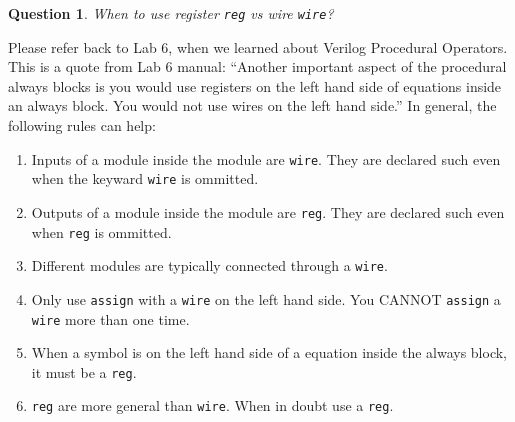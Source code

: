 \documentclass{article}
\newtheorem{question}{Question}
\begin{document}
\begin{question}
  When to use register \lstinline[style=verilog-style]{reg} vs wire \lstinline[style=verilog-style]{wire}?
\end{question}
Please refer back to Lab 6, when we learned about Verilog Procedural Operators.
This is a quote from Lab 6 manual: ``Another important aspect of the procedural
always blocks is you would use registers on the left hand side of equations
inside an always block. You would not use wires on the left hand side.'' In
general, the following rules can help:
\begin{enumerate}
  \item Inputs of a module inside the module are
    \lstinline[style=verilog-style]{wire}. They are declared such even when the
    keyward \lstinline[style=verilog-style]{wire} is ommitted.
  \item Outputs of a module inside the module are
    \lstinline[style=verilog-style]{reg}. They are declared such even when
    \lstinline[style=verilog-style]{reg} is ommitted.
  \item Different modules are typically connected through a \lstinline[style=verilog-style]{wire}.
  \item Only use \lstinline[style=verilog-style]{assign} with a \lstinline[style=verilog-style]{wire} on the left hand side. You CANNOT
    \lstinline[style=verilog-style]{assign} a
    \lstinline[style=verilog-style]{wire} more than one time.
  \item When a symbol is on the left hand side of a equation inside the always
    block, it must be a \lstinline[style=verilog-style]{reg}.
  \item \lstinline[style=verilog-style]{reg} are more general than
    \lstinline[style=verilog-style]{wire}. When in doubt use a \lstinline[style=verilog-style]{reg}.
\end{enumerate}
\end{document}
